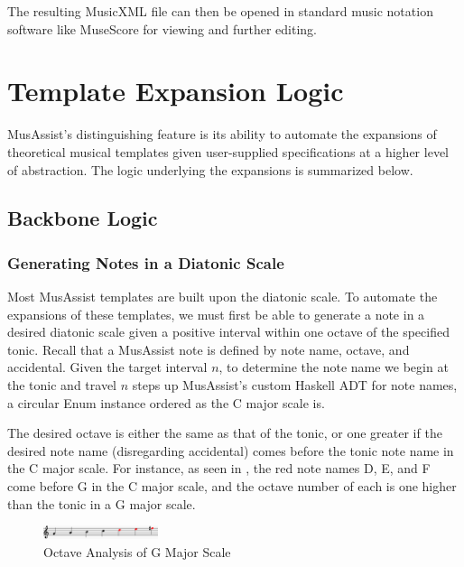 \documentclass{article}
\begin{document}
The resulting MusicXML file can then be opened in standard music notation software like MuseScore for viewing and further editing.


\section{Template Expansion Logic}\label{sec:template_expansions}
MusAssist’s distinguishing feature is its ability to automate the expansions of theoretical musical templates given user-supplied specifications at a higher level of abstraction. The logic underlying the expansions is summarized below. 

\subsection{Backbone Logic}
\subsubsection{Generating Notes in a Diatonic Scale}
\label{sec:note_generate}
Most MusAssist templates are built upon the diatonic scale. To automate the expansions of these templates, we must first be able to generate a note in a desired diatonic scale given a positive interval within one octave of the specified tonic. Recall that a MusAssist note is defined by note name, octave, and accidental. Given the target interval $n$, to determine the note name we begin at the tonic and travel $n$ steps up MusAssist’s custom Haskell ADT for note names, a circular Enum instance ordered as the C major scale is. 

The desired octave is either the same as that of the tonic, or one greater if the desired note name (disregarding accidental) comes before the tonic note name in the C major scale. For instance, as seen in , the red note names D, E, and F come before G in the C major scale, and the octave number of each is one higher than the tonic in a G major scale.

\vspace{-2mm}
\begin{figure}[h!]
\centering
\includegraphics[width=0.3\textwidth]{images/note_octave_logic}
\caption{\centering Octave Analysis of G Major Scale}
\label{note_octaves}
\vspace{-3mm}
\end{figure}
\end{document}
